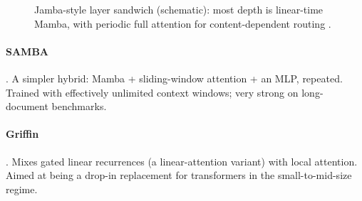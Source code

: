 \begin{figure}[htbp]
\centering
{}
\caption{Jamba-style layer sandwich (schematic): most depth is linear-time Mamba,
with periodic full attention for content-dependent routing \citep{lieber2024jamba}.}
\label{fig:jamba-stack}
\end{figure}

\paragraph{SAMBA} \citep{ren2024samba}. A simpler hybrid: Mamba +
sliding-window attention + an MLP, repeated. Trained with effectively
unlimited context windows; very strong on long-document benchmarks.

\paragraph{Griffin} \citep{de2024griffin}. Mixes gated linear recurrences
(a linear-attention variant) with local attention. Aimed at being a
drop-in replacement for transformers in the small-to-mid-size regime.

